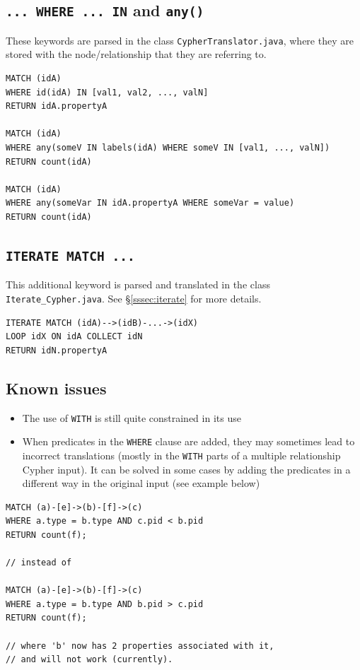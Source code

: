 \documentclass[letterpaper]{ltxdoc}
\begin{document}
\subsection*{\texttt{... WHERE ... IN} and \texttt{any()}}
These keywords are parsed in the class \texttt{CypherTranslator.java}, where they are stored with the node/relationship that they are referring to.

\medskip

\begin{lstlisting}[language = Cypher]
MATCH (idA)
WHERE id(idA) IN [val1, val2, ..., valN]
RETURN idA.propertyA

MATCH (idA)
WHERE any(someV IN labels(idA) WHERE someV IN [val1, ..., valN])
RETURN count(idA)

MATCH (idA)
WHERE any(someVar IN idA.propertyA WHERE someVar = value)
RETURN count(idA)
\end{lstlisting}

\subsection*{\texttt{ITERATE MATCH ...}}
This additional keyword is parsed and translated in the class \texttt{Iterate\_Cypher.java}. See \S \ref{sssec:iterate} for more details.

\medskip

\begin{lstlisting}[language = Cypher]
ITERATE MATCH (idA)-->(idB)-...->(idX)
LOOP idX ON idA COLLECT idN
RETURN idN.propertyA
\end{lstlisting}

\subsection{Known issues}
\begin{itemize}
\item The use of \texttt{WITH} is still quite constrained in its use
\item When predicates in the \texttt{WHERE} clause are added, they may sometimes lead to incorrect translations (mostly in the \texttt{WITH} parts of a multiple relationship Cypher input). It can be solved in some cases by adding the predicates in a different way in the original input (see example below)
\end{itemize}

\begin{lstlisting}[language = Cypher]
MATCH (a)-[e]->(b)-[f]->(c)
WHERE a.type = b.type AND c.pid < b.pid
RETURN count(f);

// instead of

MATCH (a)-[e]->(b)-[f]->(c)
WHERE a.type = b.type AND b.pid > c.pid
RETURN count(f);

// where 'b' now has 2 properties associated with it,
// and will not work (currently).
\end{lstlisting}
\end{document}
